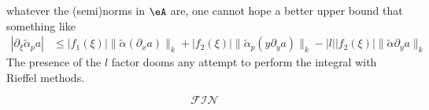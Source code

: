 whatever the (semi)norms in $\eA$ are, one cannot hope a better upper bound that something like
\[ 
 \begin{split} 
  | \partial_{\xi}\tilde\alpha_pa |&\leq | f_1(\xi) |\| \tilde\alpha(\partial_xa) \|_k+| f_2(\xi) |\| \tilde\alpha_p(y\partial_ya) \|_k-| l | |f_2(\xi) |\| \tilde\alpha\partial_ya \|_k
\end{split}
\]
The presence of the $l$ factor dooms any attempt to perform the integral with Rieffel methods.

\[
  \mathcal{FIN}
\]



